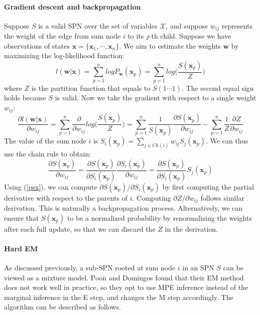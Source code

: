 \documentclass[10pt, titlepage]{article}
\theoremstyle{definition}
\newcommand\mb{\mathbf}
\begin{document}
\paragraph{Gradient descent and backpropagation} Suppose $S$ is a valid SPN over the set of variables $\mathcal{X}$, and suppose $w_{ij}$ represents the weight of the edge from sum node $i$ to its $j$-th child. Suppose we have observations of states $\mb{x}=\{\mb{x}_1,\cdots,\mb{x}_n\}$. We aim to estimate the weights $\mb{w}$ by maximizing the log-likelihood function:
\begin{equation}
l(\mb{w}|\mb{x})=\sum_{p=1}^{n}logP_{\mb{w}}(\mb{x}_p)=\sum_{p=1}^{n}log\Big(\frac{S(\mb{x}_p)}{Z}\Big)
\end{equation}
where $Z$ is the partition function that equals to $S(1\cdots1)$. The second equal sign holds because $S$ is valid. Now we take the gradient with respect to a single weight $w_{ij}$:
\begin{equation}
\label{dl}
\frac{\partial l(\mb{w}|\mb{x})}{\partial w_{ij}}=\sum_{p=1}^{n}\frac{\partial}{\partial w_{ij}}log\Big(\frac{S(\mb{x}_p)}{Z}\Big)=\sum_{p=1}^{n}\frac{1}{S(\mb{x}_p)}\frac{\partial S(\mb{x}_p)}{\partial w_{ij}}-\sum_{p=1}^{n}\frac{1}{Z}\frac{\partial Z}{\partial w_{ij}}
\end{equation}
The value of the sum node $i$ is $S_i(\mb{x}_p)=\sum_{j\in Ch(i)}w_{ij}S_j(\mb{x}_p)$. We can thus use the chain rule to obtain:
\begin{equation}
\frac{\partial S(\mb{x}_p)}{\partial w_{ij}} = \frac{\partial S(\mb{x}_p)}{\partial S_i(\mb{x}_p)}\frac{\partial S_i(\mb{x}_p)}{\partial w_{ij}}=\frac{\partial S(\mb{x}_p)}{\partial S_i(\mb{x}_p)}S_j(\mb{x}_p)
\end{equation}
Using (\ref{psx}), we can compute $\partial S(\mb{x}_p)/\partial S_i(\mb{x}_p)$ by first computing the partial derivative with respect to the parents of $i$. Computing $\partial Z/\partial w_{ij}$ follows similar derivation. This is naturally a backpropagation process. Alternatively, we can ensure that $S(\mb{x}_p)$ to be a normalized probability by renormalizing the weights after each full update, so that we can discard the $Z$ in the derivation.

\paragraph{Hard EM} As discussed previously, a sub-SPN rooted at sum node $i$ in an SPN $S$ can be viewed as a mixture model. 
Poon and Domingos found that their EM method does not work well in practice, so they opt to use MPE inference instead of the marginal inference in the E step, and changes the M step accordingly. The algorithm can be described as follows.
\end{document}

